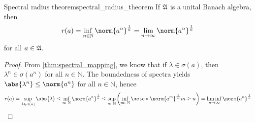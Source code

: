 \begin{theorem}{Spectral radius theorem}{spectral_radius_theorem}
    If \(\mathfrak{A}\) is a unital Banach algebra, then
    \begin{equation*}
        r(a) = \inf_{n\in \mathbb{N}}{\norm{a^n}^{\frac{1}{n}}}= \lim_{n\to\infty}{\norm{a^n}^{\frac1n}}
    \end{equation*}
    for all \(a \in \mathfrak{A}\).
\end{theorem}
\begin{proof}
    From \cref{thm:spectral_mapping}, we know that if \(\lambda \in \sigma(a)\), then \(\lambda^n \in \sigma(a^n)\) for all \(n \in \mathbb{N}\). The boundedness of spectra yields \(\abs{\lambda^n} \leq \norm{a^n}\) for all \(n \in \mathbb{N}\), hence
    \begin{equation*}
        r(a) = \sup_{\lambda \in \sigma(a)}{\abs{\lambda}}\leq\inf_{n\in \mathbb{N}}{\norm{a^n}^{\frac1n}} \leq \sup_{n \in \mathbb{N}}{\left(\inf_{m \in \mathbb{N}}{\setc*{\norm{a^m}^{\frac1m}}{m \geq n}}\right)} = \liminf_{n\to\infty}{\norm{a^n}^{\frac1n}}
    \end{equation*}

\end{proof}

